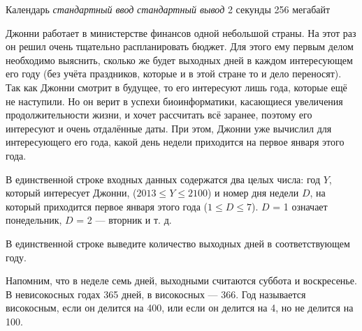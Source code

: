 \begin{problem}%
{Календарь}%
{\textsl{стандартный ввод}}%
{\textsl{стандартный вывод}}%
{2 секунды}%
{256 мегабайт}{}

Джонни работает в министерстве финансов одной небольшой страны. На этот раз он решил очень тщательно распланировать бюджет. Для этого ему первым делом необходимо выяснить, сколько же будет выходных дней в каждом интересующем его году (без учёта праздников, которые и в этой стране то и дело переносят).\\

Так как Джонни смотрит в будущее, то его интересуют лишь года, которые ещё не наступили. Но он верит в успехи биоинформатики, касающиеся увеличения продолжительности жизни, и хочет рассчитать всё заранее, поэтому его интересуют и очень отдалённые даты. При этом, Джонни уже вычислил для интересующего его года, какой день недели приходится на первое января этого года.

\InputFile

В единственной строке входных данных содержатся два целых числа: год $Y$, который интересует Джонни, ($2013 \le Y \le 2100$) и номер дня недели $D$, на который приходится первое января этого года ($1 \le D \le 7$). $D$ = 1 означает понедельник, $D$ = 2 — вторник и т. д.

\OutputFile

В единственной строке выведите количество выходных дней в соответствующем году.

\Examples

\begin{example}
%
\end{example}

\Note

Напомним, что в неделе семь дней, выходными считаются суббота и воскресенье. В невисокосных годах 365 дней, в високосных — 366. Год называется високосным, если он делится на 400, или если он делится на 4, но не делится на 100.

\end{problem}